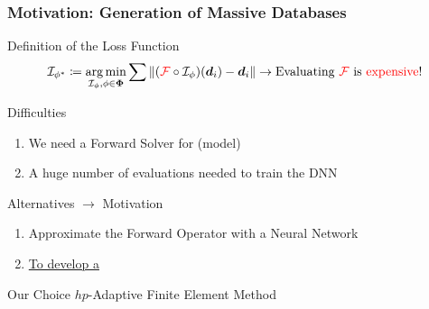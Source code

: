 \documentclass[10pt,aspectratio=149]{beamer}
\begin{document}
\begin{frame}
    \frametitle{Motivation: Generation of Massive Databases}    
    
    \vspace{-2mm}
    
    \begin{block}{Definition of the Loss Function}
        \[
        \mathcal{I}_{\phi^*} \coloneqq \operatorname*{arg\,min}_{\mathcal{I}_{\phi},\phi \in \boldsymbol{\Phi}} \sum \left\| (\textcolor{red}{\mathcal{F}} \circ \mathcal{I}_{\phi})(\boldsymbol{d}_i) - \boldsymbol{d}_i \right\| \rightarrow \text{Evaluating } \textcolor{red}{\mathcal{F}} \text{ is \textcolor{red}{expensive}!}
        \]
    \end{block}
        
    \begin{block}{Difficulties}
        \begin{enumerate}
            \item We need a Forward Solver \tcr{$\calF$} for  (model)
            \item A huge number of evaluations needed to train the DNN
        \end{enumerate}
    \end{block}
    
    \begin{block}{Alternatives $\rightarrow$ Motivation}
        \begin{enumerate}
            \item Approximate the Forward Operator with a Neural Network
            \item \underline{To develop a }
        \end{enumerate}
    \end{block}
    
    \begin{block}{Our Choice}
        \centering
        $hp$-Adaptive Finite Element Method
    \end{block}
    

\end{frame}
\end{document}
